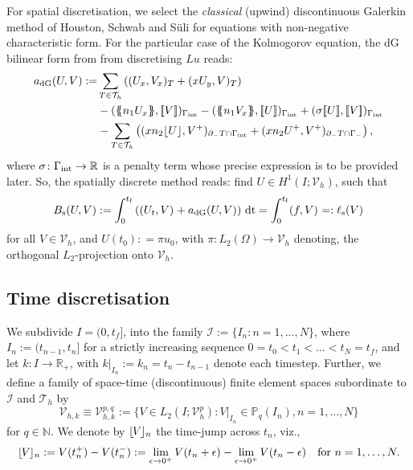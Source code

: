 \documentclass{amsart}
\newcommand{\jump}[1]{[\kern-0.6mm [{#1}]\kern-0.6mm]}
\newcommand{\tjump}[1]{\lfloor\kern-0.4mm{#1}\kern-0.4mm\rfloor}
\newcommand{\av}[1]{\{\kern-1.2mm \{{#1}\}\kern-1.2mm\}}
\newcommand{\inner}[3]{({#1},{#2})_{{#3}}}
\newcommand{\Th}{\mathcal{T}_h}
\newcommand{\gint}{\Gamma_{\rm int}}
\newcommand{\gif}{\Gamma_-}
\newcommand{\R}{\mathbb{R}}
\newcommand{\normal}{{n}}
\newcommand{\jumpu}[1]{ \lfloor #1 \rfloor }
\newcommand{\tf}{{t_{\rm f}}}
\newcommand{\dt}{\,{\rm dt}}
\theoremstyle{definition}
\theoremstyle{remark}
\numberwithin{equation}{section}
\begin{document}
For spatial discretisation, we select the \emph{classical} (upwind) discontinuous Galerkin method of Houston, Schwab and S\"uli \cite{hss} for equations with non-negative characteristic form. For the particular case of the Kolmogorov equation, the dG bilinear form from from \cite{hss} discretising $Lu$ reads:
\begin{equation}\label{def: spatial bilinear form}
\begin{split}
    a_{\rm dG}(U,V):=&
    \sum_{T \in \Th} \left( \inner{U_x}{V_x}{T} + \inner{x U_y}{V}{T}\right)\\
  &
  -
    \inner{\av{\normal_1 U_x}}{\jump{V}}{\gint }
    -
    \inner{\av{\normal_1 V_x}}{\jump{U}}{\gint }
    +
    \inner{\sigma \jump{U}}{\jump{V}}{\gint}
    \\
    &-
    \sum_{T \in \Th} \left(
    \inner{x\normal_2 \jumpu{U}}{V^+}{\partial_- T \cap \gint}
    +
    \inner{x\normal_2 U^+ }{ V^+ }{\partial_- T \cap \gif} \right),
\end{split}\end{equation}
where $\sigma\colon \gint \to \R$ is a penalty term whose precise expression is to be provided later. So, the spatially discrete method reads: find $U\in H^1(I; {\mathcal{V}}_h)$, such that
\begin{equation}\label{def: seim-discrete bilinear form}
    B_{\rm s}(U,V)
    :=
    \int_0^{\tf}  \left(\inner{U_t}{V}{} +  a_{\rm dG}(U,V) \right) \dt
    =
    \int_0^\tf
    \inner{f}{V}{}=:   \ell_{\rm s}(V)
    \end{equation}
for all $V\in  {\mathcal{V}}_h$, and $U(t_0): = \pi u_0$, with $\pi\colon L_2(\Omega) \rightarrow  {\mathcal{V}}_h$ denoting, the orthogonal $L_2$-projection onto $ {\mathcal{V}}_h$.

\subsection{Time discretisation}



We subdivide $I=(0,t_f]$, into the family $\mathcal{I} := \{ I_n : n = 1,\ldots, N\}$, where $I_n := (t_{n-1}, t_n]$ for a strictly increasing sequence $0 = t_0 < t_1 < \ldots < t_N = t_f$, and let $k\colon I\to\mathbb{R}_+$, with $k|_{I_n} := k_n = t_n - t_{n-1}$ denote each timestep.
Further, we define a family of space-time (discontinuous) finite element spaces subordinate to $\mathcal{I}$ and $\Th $ by
\begin{equation*}
	 {\mathcal{V}}_{h,k}\equiv	 {\mathcal{V}}_{h,k}^{p,q} := \{ V \in L_2(I;  {\mathcal{V}}_h^p) : V|_{I_n} \in \mathbb{P}_q(I_n), n=1,\dots, N\}
\end{equation*}
for $q \in\mathbb{N}$. We denote by $\tjump{V}_{n}$ the time-jump across $t_n$, viz.,
\[
	\tjump{V}_n := V(t_n^+) - V(t_n^-) := \lim_{\epsilon \to 0^+} V(t_n+\epsilon) - \lim_{\epsilon \to 0^+} V(t_n-\epsilon)\quad\text{for } n=1,\dots,N.
\]
\end{document}
